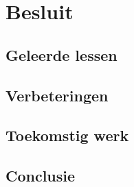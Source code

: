 \chapter{Besluit}
\label{chap:besluit}

\section{Geleerde lessen}

\section{Verbeteringen}


\section{Toekomstig werk}

\section{Conclusie}
%

